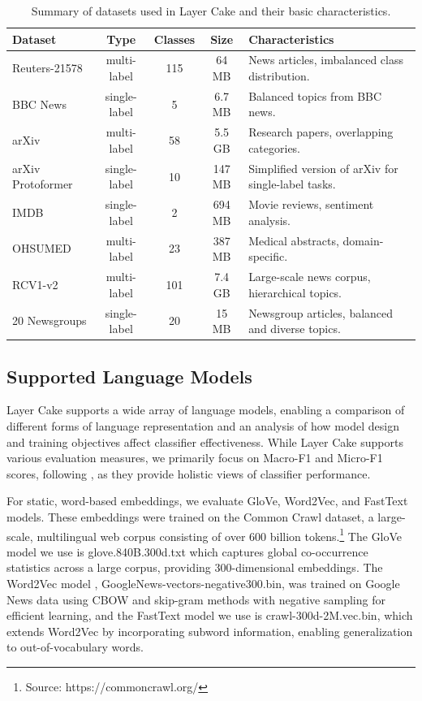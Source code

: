 \documentclass[final]{clv2025}
\begin{document}
\sloppy
\begin{table}[h!]
\centering
\caption{Summary of datasets used in Layer Cake and their basic characteristics.}
\label{tab1}
\scriptsize
\begin{tabularx}{\textwidth}{l c c c X}
\toprule
\textbf{Dataset} & \textbf{Type} & \textbf{Classes} & \textbf{Size} & \textbf{Characteristics} \\
\midrule
Reuters-21578 & multi-label & 115 & 64 MB & News articles, imbalanced class distribution. \\
BBC News & single-label & 5 & 6.7 MB & Balanced topics from BBC news. \\
arXiv & multi-label & 58 & 5.5 GB & Research papers, overlapping categories. \\
arXiv Protoformer & single-label & 10 & 147 MB & Simplified version of arXiv for single-label tasks. \\
IMDB & single-label & 2 & 694 MB & Movie reviews, sentiment analysis. \\
OHSUMED & multi-label & 23 & 387 MB & Medical abstracts, domain-specific. \\
RCV1-v2 & multi-label & 101 & 7.4 GB & Large-scale news corpus, hierarchical topics. \\
20 Newsgroups & single-label & 20 & 15 MB & Newsgroup articles, balanced and diverse topics. \\
\bottomrule
\end{tabularx}
\end{table}


\subsection{Supported Language Models}

Layer Cake supports a wide array of language models, enabling a comparison of different forms of language representation and an analysis of how model design and training objectives affect classifier effectiveness. While Layer Cake supports various evaluation measures, we primarily focus on Macro-F1 and Micro-F1 scores, following \cite{moreo2021}, as they provide holistic views of classifier performance. 

For static, word-based embeddings, we evaluate GloVe, Word2Vec, and FastText models. These embeddings were trained on the Common Crawl dataset, a large-scale, multilingual web corpus consisting of over 600 billion tokens.\footnote{Source: https://commoncrawl.org/} The GloVe model \cite{pennington} we use is glove.840B.300d.txt which captures global co-occurrence statistics across a large corpus, providing 300-dimensional embeddings. The Word2Vec model \cite{mikolov}, GoogleNews-vectors-negative300.bin, was trained on Google News data using CBOW and skip-gram methods with negative sampling for efficient learning, and the FastText \cite{articleboja} model we use is crawl-300d-2M.vec.bin, which extends Word2Vec by incorporating subword information, enabling generalization to out-of-vocabulary words.
\end{document}
